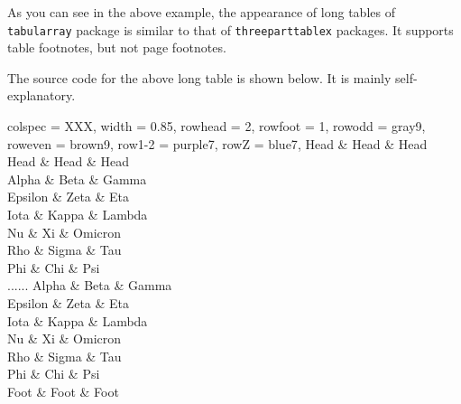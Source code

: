 \documentclass[oneside]{book}
\begin{document}
As you can see in the above example, the appearance of long tables of \verb!tabularray! package
is similar to that of \verb!threeparttablex! packages.
It supports table footnotes, but not page footnotes.

\newpage

The source code for the above long table is shown below. It is mainly self-explanatory.

\begin{codehigh}
\begin{longtblr}[
  theme = fancy,
  caption = {A Long Long Long Long Long Long Long Table},
  entry = {Short Caption},
  label = {tblr:test},
  note{a} = {It is the first footnote.},
  note{$\dag$} = {It is the second long long long long long long footnote.},
  remark{Note} = {Some general note. Some general note. Some general note.},
  remark{Source} = {Made up by myself. Made up by myself. Made up by myself.},
]{
  colspec = {XXX}, width = 0.85\linewidth,
  rowhead = 2, rowfoot = 1,
  row{odd} = {gray9}, row{even} = {brown9},
  row{1-2} = {purple7}, row{Z} = {blue7},
}
\hline
 Head    & Head  & Head    \\
\hline
 Head    & Head  & Head    \\
\hline
 Alpha   & Beta  & Gamma   \\
\hline
 Epsilon & Zeta       & Eta    \\
\hline
 Iota    & Kappa\TblrNote{$\dag$} & Lambda \\
\hline
 Nu      & Xi    & Omicron \\
\hline
 Rho     & Sigma & Tau     \\
\hline
 Phi     & Chi   & Psi     \\
\hline
......
\hline
 Alpha   & Beta  & Gamma   \\
\hline
 Epsilon & Zeta  & Eta     \\
\hline
 Iota    & Kappa & Lambda  \\
\hline
 Nu      & Xi    & Omicron \\
\hline
 Rho     & Sigma & Tau     \\
\hline
 Phi     & Chi   & Psi     \\
\hline
 Foot    & Foot  & Foot    \\
\hline
\end{longtblr}
\end{codehigh}
\end{document}
